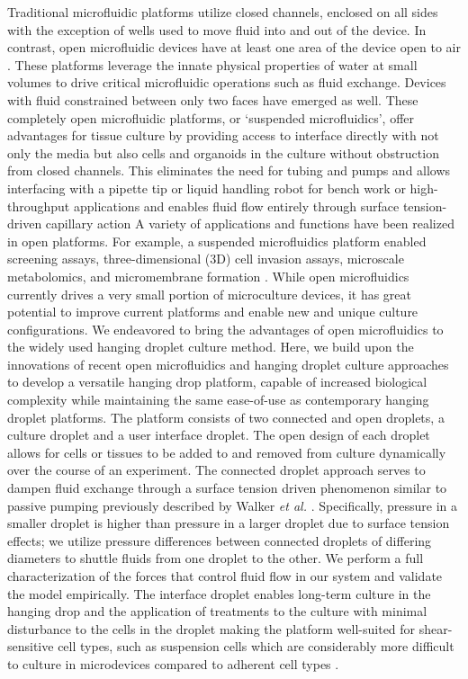 Traditional microfluidic platforms utilize closed channels, enclosed on all sides with the exception of wells used to move fluid into and out of the device. In contrast, open microfluidic devices have at least one area of the device open to air \cite{Kaigala2012, Zimmermann2005a, Walker2002}. These platforms leverage the innate physical properties of water at small volumes to drive critical microfluidic operations such as fluid exchange. Devices with fluid constrained between only two faces have emerged as well. These completely open microfluidic platforms, or ‘suspended microfluidics’, offer advantages for tissue culture by providing access to interface directly with not only the media but also cells and organoids in the culture without obstruction from closed channels. This eliminates the need for tubing and pumps and allows interfacing with a pipette tip or liquid handling robot for bench work or high-throughput applications and enables fluid flow entirely through surface tension-driven capillary action A variety of applications and functions have been realized in open platforms. For example, a suspended microfluidics platform enabled screening assays, three-dimensional (3D) cell invasion assays, microscale metabolomics, and micromembrane formation \cite{Casavant2013}. While open microfluidics currently drives a very small portion of microculture devices, it has great potential to improve current platforms and enable new and unique culture configurations. We endeavored to bring the advantages of open microfluidics to the widely used hanging droplet culture method.
Here, we build upon the innovations of recent open microfluidics and hanging droplet culture approaches to develop a versatile hanging drop platform, capable of increased biological complexity while maintaining the same ease-of-use as contemporary hanging droplet platforms. The platform consists of two connected and open droplets, a culture droplet and a user interface droplet. The open design of each droplet allows for cells or tissues to be added to and removed from culture dynamically over the course of an experiment. The connected droplet approach serves to dampen fluid exchange through a surface tension driven phenomenon similar to passive pumping previously described by Walker \textit{et al.}  \cite{Beebe2002a}.  Specifically, pressure in a smaller droplet is higher than pressure in a larger droplet due to surface tension effects; we utilize pressure differences between connected droplets of differing diameters to shuttle fluids from one droplet to the other.  We perform a full characterization of the forces that control fluid flow in our system and validate the model empirically. The interface droplet enables long-term culture in the hanging drop and the application of treatments to the culture with minimal disturbance to the cells in the droplet making the platform well-suited for shear-sensitive cell types, such as suspension cells which are considerably more difficult to culture in microdevices compared to adherent cell types \cite{Young2012}. 

